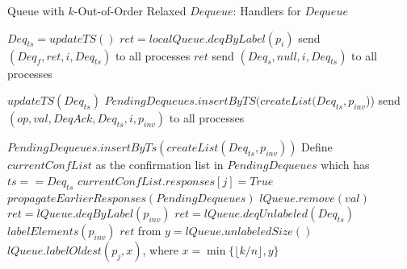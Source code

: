 \documentclass[a4paper,anonymous,USenglish]{lipics-v2021}
\theoremstyle{definition}
\begin{document}
\begin{algorithm}
  \caption{Queue with $k$-Out-of-Order Relaxed $Dequeue$: Handlers for $Dequeue$}\label{alg:relaxed}
  \begin{algorithmic}[1]
      \State $Deq_{ts} = updateTS()$
      \label{oooline:checkFast}
        \State $ret = localQueue.deqByLabel(p_i)$ \label{oooline:fastDeq}
        \State send $(Deq_f, ret, i, Deq_{ts})$ to all processes
        \State \Return $ret$ \label{oooline:fastDeqResponse}
      \Else
        \State send $(Deq_s, null, i, Deq_{ts})$ to all processes
      \EndIf
    \EndFunction

      \State $updateTS(Deq_{ts})$
        \State $PendingDequeues.insertByTS(createList(Deq_{ts}, p_{inv}$))
      \EndIf
      \State send $(op, val, DeqAck, Deq_{ts}, i, p_{inv})$ to all processes
    \EndFunction

        \State $PendingDequeues.insertByTs(createList(Deq_{ts}, p_{inv}))$
      \EndIf
      \State Define $currentConfList$ as the confirmation list in $PendingDequeues$ which has $ts == Deq_{ts}$
      \State $currentConfList.responses[j] = True$
      \State $propagateEarlierResponses(PendingDequeues)$ 
        \label{oooline:localExec}
             $lQueue.remove(val)$\EndIf
          \Else    
              \State $ret = lQueue.deqByLabel(p_{inv})$ \label{oooline:sDeqChooseLabeled}
            \Else
              \State $ret = lQueue.deqUnlabeled(Deq_{ts})$ \label{oooline:sDeqChooseUnlabeled}
            \EndIf
            \State $labelElements(p_{inv})$\label{oooline:label}
              \State \Return $ret$
            \EndIf
          \EndIf 
        \EndIf 
      \EndFor
      \EndFunction
%
       from \cite{TalmageWelch14}
      \State $y = lQueue.unlabeledSize()$
      \State $lQueue.labelOldest(p_j,x)$, where $x = \min\{\lfloor k/n\rfloor, y\}$\label{oooline:labelOldest}
      \EndFunction
  \end{algorithmic}
\end{algorithm}
\end{document}
